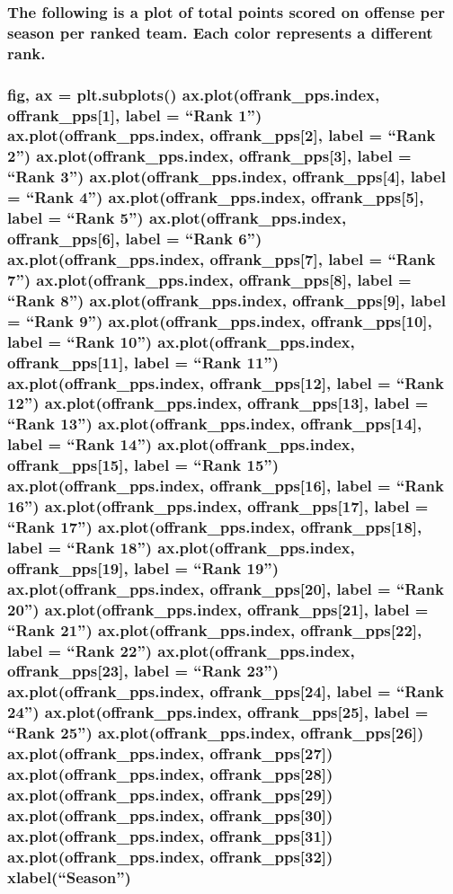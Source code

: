 \documentclass[letterpaper,10pt,english]{/anaconda/lib/python2.7/site-packages/sphinx/texinputs/sphinxhowto}
\begin{document}
\subsubsection{The following is a plot of total points scored on offense per season per
ranked team. Each color represents a different rank.}\subsubsection{fig, ax = plt.subplots() ax.plot(offrank\_pps.index,
offrank\_pps{[}1{]}, label = ``Rank 1'') ax.plot(offrank\_pps.index,
offrank\_pps{[}2{]}, label = ``Rank 2'') ax.plot(offrank\_pps.index,
offrank\_pps{[}3{]}, label = ``Rank 3'') ax.plot(offrank\_pps.index,
offrank\_pps{[}4{]}, label = ``Rank 4'') ax.plot(offrank\_pps.index,
offrank\_pps{[}5{]}, label = ``Rank 5'') ax.plot(offrank\_pps.index,
offrank\_pps{[}6{]}, label = ``Rank 6'') ax.plot(offrank\_pps.index,
offrank\_pps{[}7{]}, label = ``Rank 7'') ax.plot(offrank\_pps.index,
offrank\_pps{[}8{]}, label = ``Rank 8'') ax.plot(offrank\_pps.index,
offrank\_pps{[}9{]}, label = ``Rank 9'') ax.plot(offrank\_pps.index,
offrank\_pps{[}10{]}, label = ``Rank 10'') ax.plot(offrank\_pps.index,
offrank\_pps{[}11{]}, label = ``Rank 11'') ax.plot(offrank\_pps.index,
offrank\_pps{[}12{]}, label = ``Rank 12'') ax.plot(offrank\_pps.index,
offrank\_pps{[}13{]}, label = ``Rank 13'') ax.plot(offrank\_pps.index,
offrank\_pps{[}14{]}, label = ``Rank 14'') ax.plot(offrank\_pps.index,
offrank\_pps{[}15{]}, label = ``Rank 15'') ax.plot(offrank\_pps.index,
offrank\_pps{[}16{]}, label = ``Rank 16'') ax.plot(offrank\_pps.index,
offrank\_pps{[}17{]}, label = ``Rank 17'') ax.plot(offrank\_pps.index,
offrank\_pps{[}18{]}, label = ``Rank 18'') ax.plot(offrank\_pps.index,
offrank\_pps{[}19{]}, label = ``Rank 19'') ax.plot(offrank\_pps.index,
offrank\_pps{[}20{]}, label = ``Rank 20'') ax.plot(offrank\_pps.index,
offrank\_pps{[}21{]}, label = ``Rank 21'') ax.plot(offrank\_pps.index,
offrank\_pps{[}22{]}, label = ``Rank 22'') ax.plot(offrank\_pps.index,
offrank\_pps{[}23{]}, label = ``Rank 23'') ax.plot(offrank\_pps.index,
offrank\_pps{[}24{]}, label = ``Rank 24'') ax.plot(offrank\_pps.index,
offrank\_pps{[}25{]}, label = ``Rank 25'') ax.plot(offrank\_pps.index,
offrank\_pps{[}26{]}) ax.plot(offrank\_pps.index, offrank\_pps{[}27{]})
ax.plot(offrank\_pps.index, offrank\_pps{[}28{]})
ax.plot(offrank\_pps.index, offrank\_pps{[}29{]})
ax.plot(offrank\_pps.index, offrank\_pps{[}30{]})
ax.plot(offrank\_pps.index, offrank\_pps{[}31{]})
ax.plot(offrank\_pps.index, offrank\_pps{[}32{]}) xlabel(``Season'')
}
\end{document}

